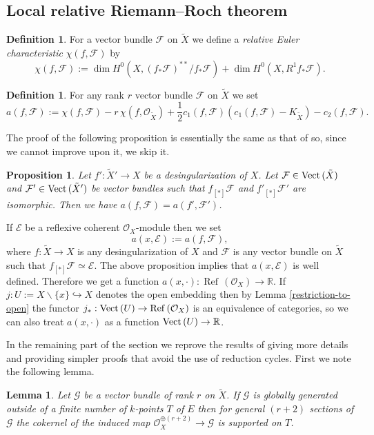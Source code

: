 \documentclass[twoside, 11pt]{article}
\theoremstyle{plain}
\newtheorem{Proposition}[Thm]{\sc Proposition}
\newtheorem{Lemma}[Thm]{\sc Lemma}
\theoremstyle{definition}
\newtheorem{Definition}[Thm]{Definition}
\theoremstyle{remark}
\newcommand{\RR}{{\mathbb R}}
\newcommand{\cE}{{\mathcal E}}
\newcommand{\cF}{{\mathcal F}}
\newcommand{\cG}{{\mathcal G}}
\newcommand{\cO}{{\mathcal O}}
\newcommand{\Refl}{{\mathop{\operatorname{Ref}\, }}}
\newcommand{\Vect}{{\mathop{{\rm Vect \,}}}}
\begin{document}
\subsection{Local relative Riemann--Roch theorem}


\begin{Definition}
For a vector bundle $\cF$ on $\tilde X$ we define a \emph{relative Euler characteristic} $\chi (f, \cF)$ by
$$\chi (f, \cF):=\dim H^0(X, (f_*\cF)^{**}/f_*\cF) +\dim H^0(X, R^1 f_*\cF).$$  
\end{Definition}


\begin{Definition}\label{addition-a}
For any rank $r$ vector bundle $ \cF$ on $\tilde X$ we set 
$$a (f,  \cF):=\chi (f, \cF)-r\, \chi(f,\cO_{\tilde X})+
\frac{1}{2}c_1(f,  \cF)(c_1(f,  \cF)-K_{\tilde X})-c_2 (f,  \cF).$$
\end{Definition}


The proof of the following proposition is essentially the same as that of \cite[Proposition 2.9]{La0}
so, since we cannot improve upon it, we skip it.

\begin{Proposition}\label{Wahl-independence}
Let $f': \tilde X'\to X$ be a desingularization of $X$.
Let $\cF \in \Vect(\tilde X)$ and $\cF' \in \Vect (\tilde X')$ be vector bundles such that
$f_{[*]}\cF$ and $f'_{[*]}\cF'$ are isomorphic.
Then we have $a (f, \cF)=a (f',  \cF ')$.
\end{Proposition}


If $\cE$ be a reflexive coherent $\cO_X$-module then we set 
$$a(x, \cE):= a (f, \cF),$$
where $f: \tilde X\to X$ is any desingularization of $X$ and $\cF$ is any vector bundle on $\tilde X$
such that $f_{[*]}\cF\simeq \cE$. The above proposition implies that $a(x, \cE)$ is well defined. Therefore  we get a function
$a(x, \cdot ): \Refl (\cO_X) \to \RR$.
If $j: U:=X\backslash \{x\} \hookrightarrow X$ denotes the  open embedding then 
by Lemma \ref{restriction-to-open} the functor $j_*: \Vect (U )\to \Refl(\cO_X)$ is an equivalence of categories, so we can also treat $a(x, \cdot )$ as a function  $\Vect (U) \to \RR$.

\medskip

In the remaining part of the section we reprove the results of  \cite[Section 4]{La0} giving more details and providing
simpler proofs that avoid the use of reduction cycles.
First we note the following lemma.

\begin{Lemma}\label{generation-by-few-sections}
Let $\cG$ be a vector bundle of rank $r$ on $\tilde X$. If $\cG$ is globally generated outside of a finite number of $k$-points $T$ of $E$ then for general $(r+2)$ sections of $\cG$ the cokernel of the induced map
$\cO ^{\oplus (r+2)}_X\to \cG$ is supported on $T$.
\end{Lemma}
\end{document}
